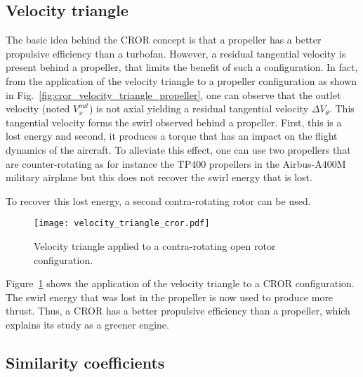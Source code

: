 \subsection{Velocity triangle}
\label{sub:cror_velocity_triangle}

The basic idea behind the CROR concept is that a propeller has a 
better propulsive efficiency than a turbofan. However,
a residual tangential velocity is present behind a propeller, that limits
the benefit of such a configuration.
In fact, from the application of the velocity triangle to a propeller configuration
as shown in Fig.~\ref{fig:cror_velocity_triangle_propeller}, one can
observe that the outlet velocity (noted $V^{out}_x$) is not axial
yielding a residual tangential velocity $\Delta V_{\theta}$. This tangential velocity forms
the swirl observed behind a propeller. First, this is a lost energy and
second, it produces a torque that has an impact on the flight dynamics
of the aircraft. To alleviate this effect, one can use two propellers
that are counter-rotating as for instance the TP$400$ propellers
in the Airbus-A$400$M military airplane but this does not recover
the swirl energy that is lost.

To recover this lost energy, a second contra-rotating rotor can be used.
\begin{figure}[htbp]
  \centering
  \texttt{[image: velocity\_triangle\_cror.pdf]}
  \caption{Velocity triangle applied to a contra-rotating open rotor configuration.}
  \label{fig:velocity_triangle_cror}
\end{figure}
Figure~\ref{fig:velocity_triangle_cror} shows the application
of the velocity triangle to a CROR configuration. The swirl
energy that was lost in the propeller is now used to 
produce more thrust. Thus, a CROR has a better propulsive
efficiency than a propeller, which explains its study as
a greener engine.

\subsection{Similarity coefficients}
\label{sub:cror_similarity_coeff}

